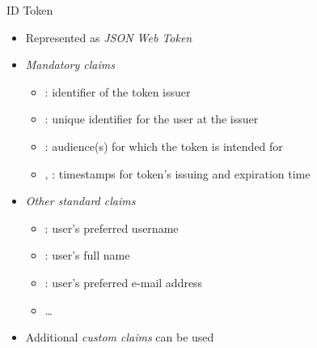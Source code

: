 \documentclass[aspectratio=169]{beamer}
\begin{document}
\begin{frame}{ID Token}
	\vspace*{1em}
	\begin{itemize}
		\item Represented as \emph{JSON Web Token} \cite{RFC7519}
		\pause
		\item \emph{Mandatory claims}
		\begin{itemize}
			\item {}: identifier of the token issuer \hfill {}
			\item {}: unique identifier for the user at the issuer \hfill {}
			\item {}: audience(s) for which the token is intended for \hfill {}
			\item {}, : timestamps for token's issuing and expiration time \hfill {}
		\end{itemize}
		\pause
		\item \emph{Other standard claims}
		\begin{itemize}
			\item {}: user's preferred username \hfill {}
			\item {}: user's full name \hfill {}
			\item {}: user's preferred e-mail address \hfill {}
			\item \dots
		\end{itemize}
		\item Additional \emph{custom claims} can be used
	\end{itemize}
	\vspace*{-1em}
\end{frame}
\end{document}
